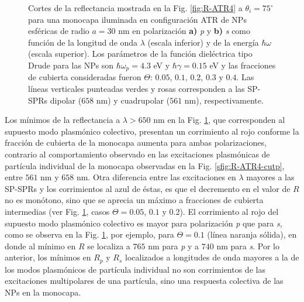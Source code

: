 \begin{figure}[h!]
	\caption{
Cortes de la reflectancia mostrada en la Fig. \ref{fig:R-ATR4} a $\theta_i = 75^\circ$ para una monocapa iluminada en configuración ATR de NPs esféricas de radio $a=30$ nm en polarización \textbf{a)} \emph{p} y \textbf{b)} \emph{s} como función de la longitud de onda $\lambda$ (escala inferior) y de la energía $\hbar\omega$ (escala superior). Los parámetros de la función dieléctrica tipo Drude para las NPs son $\hbar\omega_p = 4.3$ eV y $\hbar\gamma = 0.15$ eV y las fracciones de cubierta consideradas fueron $\Theta$: $0. 05$, $0. 1$, $0. 2$, $0. 3$ y $0. 4$. Las líneas verticales punteadas verdes y rosas corresponden a las SP-SPRs dipolar ($658$ nm) y cuadrupolar ($561$ nm), respectivamente. }\label{fig:R-ATR4-Cuts}
	\end{figure}

Los mínimos de la reflectancia a $\lambda>650$ nm en la Fig. \ref{fig:R-ATR4-Cuts}, que corresponden al supuesto modo plasmónico colectivo, presentan un corrimiento al rojo conforme la fracción de cubierta de la monocapa aumenta  para ambas polarizaciones, contrario al comportamiento observado en las excitaciones plasmónicas de partícula individual de la monocapa observadas en la Fig. \ref{sfig:R-ATR4-cutp}, entre $561$ nm y $658$ nm. Otra diferencia entre las excitaciones en $\lambda$ mayores a las SP-SPRs y los corrimientos al azul de éstas, es que el decremento en el valor de $R$ no es monótono, sino que se aprecia un máximo a fracciones de cubierta intermedias (ver Fig. \ref{fig:R-ATR4-Cuts}, casos $\Theta=0.05$, $0.1$ y $0.2$). El corrimiento al rojo del supuesto modo plasmónico colectivo es mayor para  polarización \emph{p} que para \emph{s}, como se observa en la Fig. \ref{fig:R-ATR4-Cuts}, por ejemplo, para $\Theta=0.1$ (línea naranja sólida), en donde al mínimo en $R$ se localiza a $765$ nm para \emph{p} y  a $740$ nm para \emph{s}. Por lo anterior, los mínimos en $R_p$ y $R_s$ localizados a longitudes de onda mayores a la de los modos plasmónicos de partícula individual no son corrimientos de las excitaciones multipolares de una partícula, sino una respuesta colectiva de las NPs en la monocapa. 

